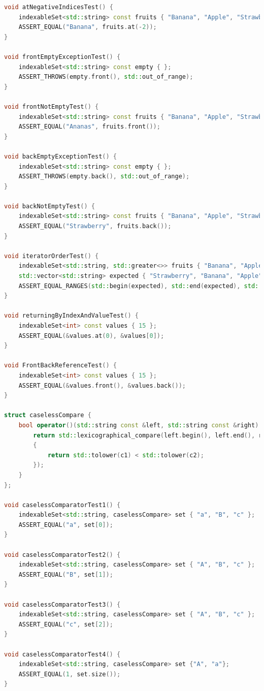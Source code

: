 \begin{lstlisting}[language=C++]
void atNegativeIndicesTest() {
	indexableSet<std::string> const fruits { "Banana", "Apple", "Strawberry", "Ananas" };
	ASSERT_EQUAL("Banana", fruits.at(-2));
}

void frontEmptyExceptionTest() {
	indexableSet<std::string> const empty { };
	ASSERT_THROWS(empty.front(), std::out_of_range);
}

void frontNotEmptyTest() {
	indexableSet<std::string> const fruits { "Banana", "Apple", "Strawberry", "Ananas" };
	ASSERT_EQUAL("Ananas", fruits.front());
}

void backEmptyExceptionTest() {
	indexableSet<std::string> const empty { };
	ASSERT_THROWS(empty.back(), std::out_of_range);
}

void backNotEmptyTest() {
	indexableSet<std::string> const fruits { "Banana", "Apple", "Strawberry", "Ananas" };
	ASSERT_EQUAL("Strawberry", fruits.back());
}

void iteratorOrderTest() {
	indexableSet<std::string, std::greater<>> fruits { "Banana", "Apple", "Strawberry", "Ananas" };
	std::vector<std::string> expected { "Strawberry", "Banana", "Apple", "Ananas" };
	ASSERT_EQUAL_RANGES(std::begin(expected), std::end(expected), std::begin(fruits), std::end(fruits));
}

void returningByIndexAndValueTest() {
	indexableSet<int> const values { 15 };
	ASSERT_EQUAL(&values.at(0), &values[0]);
}

void FrontBackReferenceTest() {
	indexableSet<int> const values { 15 };
	ASSERT_EQUAL(&values.front(), &values.back());
}

struct caselessCompare {
	bool operator()(std::string const &left, std::string const &right) const {
		return std::lexicographical_compare(left.begin(), left.end(), right.begin(), right.end(), [](char c1, char c2)
		{
			return std::tolower(c1) < std::tolower(c2);
		});
	}
};

void caselessComparatorTest1() {
	indexableSet<std::string, caselessCompare> set { "a", "B", "c" };
	ASSERT_EQUAL("a", set[0]);
}

void caselessComparatorTest2() {
	indexableSet<std::string, caselessCompare> set { "A", "B", "c" };
	ASSERT_EQUAL("B", set[1]);
}

void caselessComparatorTest3() {
	indexableSet<std::string, caselessCompare> set { "A", "B", "c" };
	ASSERT_EQUAL("c", set[2]);
}

void caselessComparatorTest4() {
	indexableSet<std::string, caselessCompare> set {"A", "a"};
	ASSERT_EQUAL(1, set.size());
}


\end{lstlisting}
